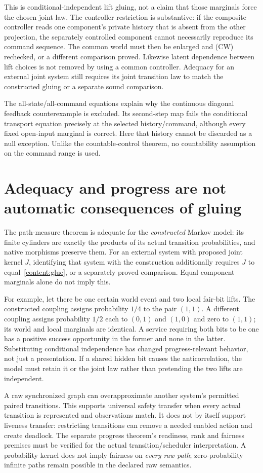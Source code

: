 \documentclass[11pt]{article}
\begin{document}
This is conditional-independent lift gluing, not a claim that those marginals force the chosen joint law. The controller restriction is substantive: if the composite controller reads one component's private history that is absent from the other projection, the separately controlled component cannot necessarily reproduce its command sequence. The common world must then be enlarged and (CW) rechecked, or a different comparison proved. Likewise latent dependence between lift choices is not removed by using a common controller. Adequacy for an external joint system still requires its joint transition law to match the constructed gluing or a separate sound comparison.

The all-state/all-command equations explain why the continuous diagonal feedback counterexample is excluded. Its second-step map fails the conditional transport equation precisely at the selected history/command, although every fixed open-input marginal is correct. Here that history cannot be discarded as a null exception. Unlike the countable-control theorem, no countability assumption on the command range is used.

\section{Adequacy and progress are not automatic consequences of gluing}
The path-measure theorem is adequate for the \emph{constructed} Markov model: its finite cylinders are exactly the products of its actual transition probabilities, and native morphisms preserve them. For an external system with proposed joint kernel $J$, identifying that system with the construction additionally requires $J$ to equal~\eqref{content:glue}, or a separately proved comparison. Equal component marginals alone do not imply this.

For example, let there be one certain world event and two local fair-bit lifts. The constructed coupling assigns probability $1/4$ to the pair $(1,1)$. A different coupling assigns probability $1/2$ each to $(0,1)$ and $(1,0)$ and zero to $(1,1)$; its world and local marginals are identical. A service requiring both bits to be one has a positive success opportunity in the former and none in the latter. Substituting conditional independence has changed progress-relevant behavior, not just a presentation. If a shared hidden bit causes the anticorrelation, the model must retain it or the joint law rather than pretending the two lifts are independent.

A raw synchronized graph can overapproximate another system's permitted paired transitions. This supports universal safety transfer when every actual transition is represented and observations match. It does not by itself support liveness transfer: restricting transitions can remove a needed enabled action and create deadlock. The separate progress theorem's readiness, rank and fairness premises must be verified for the actual transition/scheduler interpretation. A probability kernel does not imply fairness on \emph{every raw path}; zero-probability infinite paths remain possible in the declared raw semantics.
\end{document}
